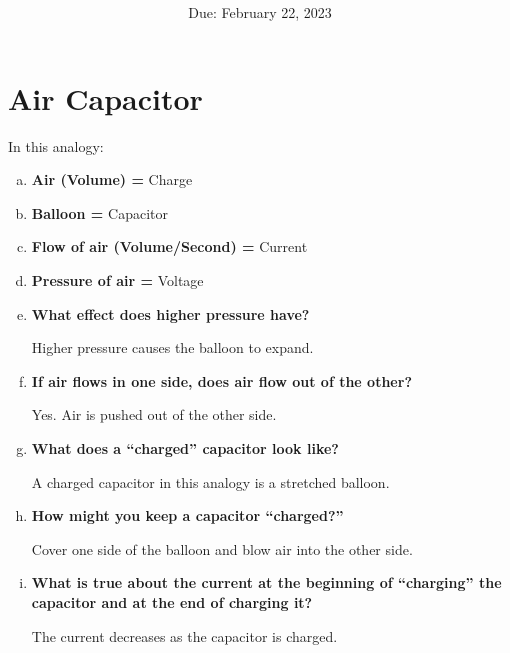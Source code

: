 \documentclass[article, 12pt]{article}
\title{
    \vspace{2in}
    \textmd{\textbf{\labTitle}}
    \normalsize\vspace{0.1in}\\
    \vspace{0.1in}\large{\text{\class: \professor}}
    \vspace{3in}
}
\author{\name}
\date{Due: February 22, 2023}
\begin{document}
    \maketitle
    \thispagestyle{empty}
    \pagebreak
    \section{Air Capacitor}
    In this analogy:
    \begin{enumerate}[a)]
        \item \textbf{Air (Volume) =} Charge
        \item \textbf{Balloon =} Capacitor 
        \item \textbf{Flow of air (Volume/Second) =} Current
        \item \textbf{Pressure of air =} Voltage
        \item \textbf{What effect does higher pressure have?}
        
        Higher pressure causes the balloon to expand.
        \item\textbf{If air flows in one side, does air flow out of the other?}
        
        Yes. Air is pushed out of the other side.
        \item \textbf{What does a ``charged'' capacitor look like?}
        
        A charged capacitor in this analogy is a stretched balloon.
        \item \textbf{How might you keep a capacitor ``charged?''}
        
        Cover one side of the balloon and blow air into the other side.
        \item \textbf{What is true about the current at the beginning of ``charging'' the capacitor and at the end of charging it?}
        
        The current decreases as the capacitor is charged. 
    \end{enumerate}
    
\end{document}

